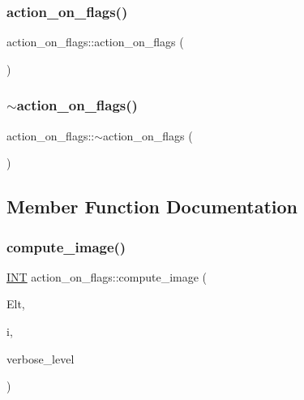 \subsubsection{\texorpdfstring{action\+\_\+on\+\_\+flags()}{action\_on\_flags()}}
{\footnotesize\ttfamily action\+\_\+on\+\_\+flags\+::action\+\_\+on\+\_\+flags (\begin{DoxyParamCaption}{ }\end{DoxyParamCaption})}

\mbox{\label{classaction__on__flags_aabddfcaaee1534c9107cfba890551888}} 
\subsubsection{\texorpdfstring{$\sim$action\+\_\+on\+\_\+flags()}{~action\_on\_flags()}}
{\footnotesize\ttfamily action\+\_\+on\+\_\+flags\+::$\sim$action\+\_\+on\+\_\+flags (\begin{DoxyParamCaption}{ }\end{DoxyParamCaption})}



\subsection{Member Function Documentation}
\mbox{\label{classaction__on__flags_a64570f1e5af9e1767802941da51cd6b5}} 
\subsubsection{\texorpdfstring{compute\+\_\+image()}{compute\_image()}}
{\footnotesize\ttfamily \mbox{\hyperlink{galois_8h_a09fddde158a3a20bd2dcadb609de11dc}{I\+NT}} action\+\_\+on\+\_\+flags\+::compute\+\_\+image (\begin{DoxyParamCaption}\item[{\mbox{\hyperlink{galois_8h_a09fddde158a3a20bd2dcadb609de11dc}{I\+NT}} $\ast$}]{Elt,  }\item[{\mbox{\hyperlink{galois_8h_a09fddde158a3a20bd2dcadb609de11dc}{I\+NT}}}]{i,  }\item[{\mbox{\hyperlink{galois_8h_a09fddde158a3a20bd2dcadb609de11dc}{I\+NT}}}]{verbose\+\_\+level }\end{DoxyParamCaption})}


